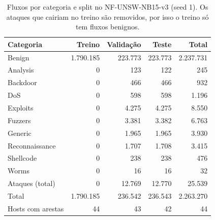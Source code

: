 \begin{table}[ht]
\centering
\caption{Fluxos por categoria e split no NF-UNSW-NB15-v3 (seed 1). Os ataques que cairiam no treino são removidos, por isso o treino só tem fluxos benignos.}
\label{tab:split-nf-unsw-nb15-v3}
\begin{tabular}{lrrrr}
\toprule
Categoria & Treino & Validação & Teste & Total \\
\midrule
Benign & 1.790.185 & 223.773 & 223.773 & 2.237.731 \\
Analysis & 0 & 123 & 122 & 245 \\
Backdoor & 0 & 466 & 466 & 932 \\
DoS & 0 & 598 & 598 & 1.196 \\
Exploits & 0 & 4.275 & 4.275 & 8.550 \\
Fuzzers & 0 & 3.381 & 3.382 & 6.763 \\
Generic & 0 & 1.965 & 1.965 & 3.930 \\
Reconnaissance & 0 & 1.707 & 1.708 & 3.415 \\
Shellcode & 0 & 238 & 238 & 476 \\
Worms & 0 & 16 & 16 & 32 \\
Ataques (total) & 0 & 12.769 & 12.770 & 25.539 \\
Total & 1.790.185 & 236.542 & 236.543 & 2.263.270 \\
Hosts com arestas & 44 & 43 & 42 & 44 \\
\bottomrule
\end{tabular}
\end{table}
